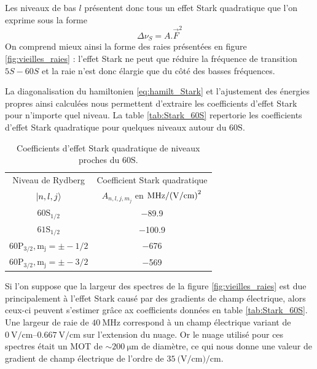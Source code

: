 Les niveaux de bas $l$ présentent donc tous un effet Stark quadratique que l'on exprime sous la forme
\begin{equation}
\label{eq:Stark_quad}
\Delta \nu_S = A.\vec{F}^2
\end{equation}
On comprend mieux ainsi la forme des raies présentées en figure \eqref{fig:vieilles_raies} :
l'effet Stark ne peut que réduire la fréquence de transition $5S-60S$ et la raie n'est donc élargie que du côté des basses fréquences.

La diagonalisation du hamiltonien \eqref{eq:hamilt_Stark} et l'ajustement des énergies propres ainsi calculées nous permettent d'extraire les coefficients d'effet Stark pour n'importe quel niveau.
La table \eqref{tab:Stark_60S} repertorie les coefficients d'effet Stark quadratique pour quelques niveaux autour du $\mathrm{60S}$.

\begin{table}[h]
	\centering
	\caption[Effet Stark quadratique des niveaux proches du $\mathrm{60S}$]{Coefficients d'effet Stark quadratique de niveaux proches du $\mathrm{60S}$.
	}
	\label{tab:Stark_60S}
	\begin{tabular}{c c }
		\toprule\midrule
		Niveau de Rydberg
		& Coefficient Stark quadratique
		\\
		$\ket{n,l,j}$
		& $A_{n,l,j,m_j}$ en $\si{\MHz \per (\V \per\cm) \squared}$ \\
		\midrule
		$\mathrm{60S_{1/2}}$
		& \SI{-89.9}{} \\
		$\mathrm{61S_{1/2}}$
		& \SI{-100.9}{} \\
		$\mathrm{60P_{3/2},m_j=\pm -1/2}$
		& \SI{-676}{} \\
		$\mathrm{60P_{3/2},m_j=\pm -3/2}$
		& \SI{-569}{} \\
		\midrule
		\bottomrule
 	\end{tabular}
\end{table}

\noindent Si l'on suppose que la largeur des spectres de la figure \eqref{fig:vieilles_raies} est due principalement à l'effet Stark causé par des gradients de champ électrique, alors ceux-ci peuvent s'estimer grâce ax coefficients données en table \eqref{tab:Stark_60S}.
Une largeur de raie de $\SI{40}{\MHz}$ correspond à un champ électrique variant de $\SIrange{0}{0.667}{\V/\cm}$ sur l'extension du nuage.
Or le nuage utilisé pour ces spectres était un MOT de $\sim \SI{200}{\um}$ de diamètre, ce qui nous donne une valeur de gradient de champ électrique de l'ordre de $\SI{35}{(\V/\cm)\per\cm}$.


